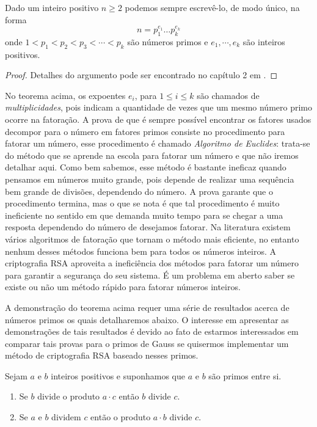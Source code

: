 \begin{Th}
\label{fat.unica} 
Dado um inteiro positivo $n\geq 2$ podemos sempre escrev\^e-lo, de modo \'unico, na forma
$$n=p_{1}^{e_1}\dots p_{k}^{e_k}$$
onde $1<p_1<p_2<p_3<\cdots<p_k$ s\~ao n\'umeros primos e $e_1, \cdots, e_k$ s\~ao inteiros positivos.
\end{Th}
\begin{proof}
	Detalhes do argumento pode ser encontrado no cap\'itulo 2 em \cite{cou:2014}.
\end{proof}

No teorema acima, os expoentes $e_i$, para $1\leq i\leq k$ s\~ao chamados de \textit{multiplicidades}, pois indicam a quantidade de vezes que um mesmo n\'umero primo ocorre na fatora\c{c}\~ao. A prova de que \'e sempre poss\'ivel encontrar os fatores usados decompor para o n\'umero em fatores primos consiste no procedimento para fatorar um n\'umero, esse procedimento \'e chamado \textit{Algoritmo de Euclides}: trata-se do m\'etodo que se aprende na escola para fatorar
um n\'umero e que n\~ao iremos detalhar aqui. Como bem sabemos, esse m\'etodo \'e bastante ineficaz quando pensamos em n\'umeros muito grande, pois depende de realizar uma sequ\^encia bem grande de divis\~oes, dependendo do n\'umero. A prova garante que o procedimento termina, mas o que se nota \'e que tal procedimento \'e muito ineficiente no sentido em que demanda muito tempo para se chegar a uma resposta dependendo do n\'umero de desejamos fatorar. Na literatura existem v\'arios algoritmos de fatora\c{c}\~ao que tornam o m\'etodo mais eficiente, no entanto nenhum desses m\'etodos funciona bem para todos os n\'umeros inteiros. A criptografia RSA aproveita a inefici\^encia dos m\'etodos para fatorar um n\'umero para garantir a seguran\c{c}a do seu sistema. \'E um problema em aberto saber se existe ou n\~ao um m\'etodo r\'apido para fatorar n\'umeros inteiros.  

A demonstra\c{c}\~ao do teorema acima requer uma s\'erie de resultados acerca de n\'umeros primos os quais detalharemos abaixo. O interesse em apresentar as demonstra\c{c}\~oes de tais resultados \'e devido ao fato de estarmos interessados em comparar tais provas para o primos de Gauss se quisermos implementar um m\'etodo de criptografia RSA baseado nesses primos. 

\begin{Th}\label{propriedade_de_primos}
Sejam $a$ e $b$ inteiros positivos e suponhamos que $a$ e $b$ s\~ao primos entre si.
\begin{enumerate}
\item Se $b$ divide o produto $a\cdot c$ ent\~ao $b$ divide $c$.
\item Se $a$ e $b$ dividem $c$ ent\~ao o produto $a\cdot b$ divide $c$.
\end{enumerate}
\end{Th}

